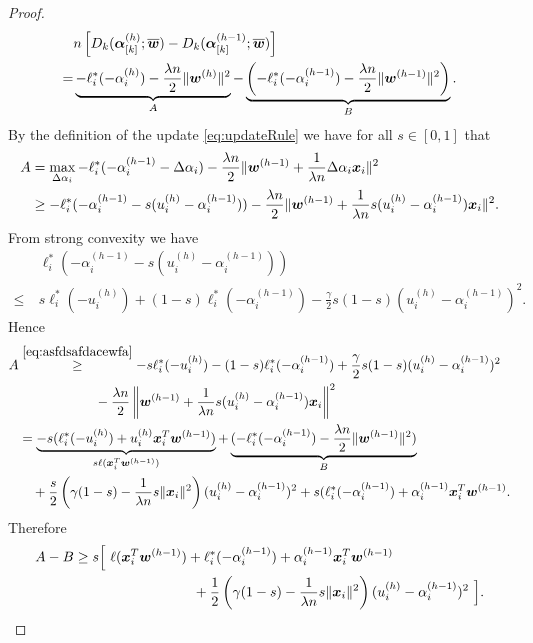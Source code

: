 \documentclass{article} %
\begin{document}
\begin{proof} %
\begin{align*}
&n \left[ D_k (  \bm{\alpha}_{[k]}^{(h)}; \overline{{\bm{w}}})
 -
 D_k (  \bm{\alpha}_{[k]}^{(h-1)}; \overline{{\bm{w}}}) \right] \\
=&
\underbrace{-
     \ell^*_i( - \alpha_i^{(h)})
    - \frac{\lambda n}{2}
    \|{\bm{w}}^{(h)}\|^2}_{A}
-
\underbrace{\left(
-
     \ell^*_i( -\alpha_i^{(h-1)})
    - \frac{\lambda n}{2}
    \|{\bm{w}}^{(h-1)}\|^2
\right)}_{B}.
\end{align*}
By the definition of the update \eqref{eq:updateRule} we have for all $s\in[0,1]$
that
\begin{align*}
A&=
\max_{\Delta\alpha_i}
 -\ell_i^*(-\alpha_i^{(h-1)}-\Delta\alpha_i)
 - \frac{\lambda n}{2}
    \|{\bm{w}}^{(h-1)} + \frac1{\lambda n }   \Delta\alpha_i  \bm{x}_i\|^2
\\&\geq
 -\ell_i^*(-\alpha_i^{(h-1)}-s (u_i^{(h)}- \alpha_i^{(h-1)}))
 - \frac{\lambda n}{2}
    \|{\bm{w}}^{(h-1)} + \frac1{\lambda n }   s (u_i^{(h)}- \alpha_i^{(h-1)}) \bm{x}_i\|^2.
\end{align*}
From strong convexity we have
\begin{align}\label{eq:asfdsafdacewfa}
&\ell_i^*\left(-\alpha_i^{(h-1)}-s (u_i^{(h)}- \alpha_i^{(h-1)})\right)\nonumber\\
\leq\ &
s \ell_i^*(- u_i^{(h)} )
+
(1-s)\ell_i^*(-\alpha_i^{(h-1)})
-\frac{\gamma}{2} s(1-s)
 (u_i^{(h)}- \alpha_i^{(h-1)})^2.
\end{align}
Hence
\begin{align*}
A&\overset{\eqref{eq:asfdsafdacewfa}}{\geq}
-s \ell_i^*(- u_i^{(h)} )
-
(1-s)\ell_i^*(-\alpha_i^{(h-1)})
+\frac{\gamma}{2} s(1-s)
 (u_i^{(h)}- \alpha_i^{(h-1)})^2\\
 &\hspace{2cm}
 - \frac{\lambda n}{2}
    \left\lVert {\bm{w}}^{(h-1)} + \frac1{\lambda n }   s (u_i^{(h)}- \alpha_i^{(h-1)}) \bm{x}_i \right\rVert^2
\\
&=
\underbrace{-s ( \ell_i^*(- u_i^{(h)}) +  u_i^{(h)}   \bm{x}_i^T {\bm{w}}^{(h-1)}  )
}_{s \ell( \bm{x}_i^T {\bm{w}}^{(h-1)} ) }
+
\underbrace{(-
 \ell_i^*(-\alpha_i^{(h-1)})
 - \frac{\lambda n}{2}
    \| {\bm{w}}^{(h-1)} \|^2)}_B
\\&\quad
+
\frac{s}{2}
 \left(
   \gamma(1-s)
   - \frac{1}{ \lambda n }
     s  \| \bm{x}_i\|^2
 \right)
  (u_i^{(h)}- \alpha_i^{(h-1)})^2
      +
     s (\ell_i^*(-\alpha_i^{(h-1)})+  \alpha_i^{(h-1)}  \bm{x}_i^T {\bm{w}}^{(h-1)}.
\end{align*}
Therefore
\begin{align}\label{eq:asfcfvgar3wggr}
A-B
&\geq
  s
  \Big[\ \ell(\x_i^T \wv^{(h-1)} )
+    \ell_i^*(-\alpha_i^{(h-1)})
+    \alpha_i^{(h-1)}  \x_i^T \wv^{(h-1)} \nonumber\\
&\hspace{3cm}
+
\frac{1}{2}
 \left(
   \gamma(1-s)
   - \frac{1}{ \lambda n }
   s
     \|     \x_i\|^2
 \right)
  (u_i^{(h)}- \alpha_i^{(h-1)})^2
      \ \Big].
\end{align}




\end{proof}
\end{document}

